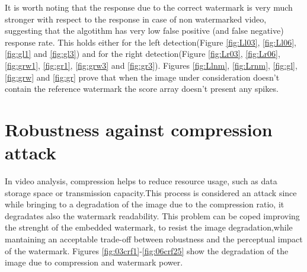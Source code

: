 It is worth noting that the response due to the correct watermark is very much stronger with respect to the response in case of non watermarked video, suggesting that the algotithm has very low false positive (and false negative) response rate. This holds either for the left detection(Figure \ref{fig:Ll03}, \ref{fig:Ll06}, \ref{fig:gl1} and \ref{fig:gl3}) and for the right detection(Figure \ref{fig:Lr03}, \ref{fig:Lr06}, \ref{fig:grw1}, \ref{fig:gr1}, \ref{fig:grw3} and \ref{fig:gr3}). Figures \ref{fig:Llnm},  \ref{fig:Lrnm}, \ref{fig:gl}, \ref{fig:grw} and \ref{fig:gr} prove that when the image under consideration doesn't contain the reference watermark the score array doesn't present any spikes.
\clearpage
\section{Robustness against compression attack}

In video analysis, compression helps to reduce resource usage, such as data storage space or transmission capacity.\newline This process is considered an attack since while bringing to a degradation of the image due to the compression ratio, it degradates also the watermark readability.\newline 
This problem can be coped improving the strenght of the embedded watermark, to resist the image degradation,while mantaining an acceptable trade-off between robustness and the perceptual impact of the watermark. \newline
Figures \ref{fig:03crf1}-\ref{fig:06crf25} show the degradation of the image due to compression and watermark power.


